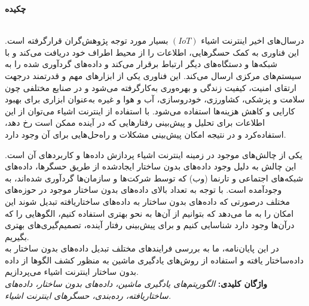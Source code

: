 %
%
%
%
\thispagestyle{empty}
\noindent
\centerline{\textbf{\large{چکیده}}} \\
درسال‌های اخیر اینترنت اشیاء $(IoT)$ بسیار مورد توجه پژوهش‌گران قرارگرفته‌ است. این فناوری به کمک حسگرهایی، ‌اطلاعات را از محیط اطراف خود دریافت می‌کند و با شبکه‌ها و دستگاه‌های دیگر ارتباط برقرار می‌کند و داده‌های گردآوری شده را به سیستم‌های مرکزی ارسال می‌کند. این فناوری یکی از ابزارهای مهم و قدرتمند درجهت ارتقای امنیت، کیفیت زندگی و بهره‌وری به‌کارگرفته می‌شود و در صنایع مختلفی چون سلامت و پزشکی، کشاورزی، خودروسازی، آب و هوا و غیره به‌عنوان ابزاری برای بهبود کارایی و کاهش هزینه‌ها استفاده می‌شود. با استفاده از اینترنت اشیاء می‌توان از این اطلاعات برای تحلیل و پیش‌بینی رفتارهایی که در آینده ممکن‌ است رخ‌ دهد، استفاده‌کرد و در نتیجه امکان پیش‌بینی مشکلات و راه‌حل‌هایی برای آن وجود ‌دارد.

یکی از چالش‌های موجود در زمینه اینترنت اشیاء پردازش داده‌ها و کاربرد‌های آن است. این چالش به دلیل وجود داده‌های بدون ساختار ایجاد‌شده از طریق حسگرها، داده‌های شبکه‌های اجتماعی و تارنما (وب) که توسط شرکت‌ها و سازمان‌ها گرد‌آوری شده‌اند، به وجود‌آمده است. با توجه به تعداد بالای داده‌های بدون ساختار موجود در حوزه‌های مختلف درصورتی که داده‌های بدون ساختار به داده‌های ساختاریافته تبدیل شوند این امکان را به ما می‌دهد که بتوانیم از آن‌ها به نحو بهتری استفاده کنیم، الگوهایی را که درآن‌ها وجود دارد شناسایی کنیم و برای پیش‌بینی رفتار آینده، تصمیم‌گیری‌های بهتری بگیریم.
\\
در این پایان‌نامه، ما به بررسی فرایندهای مختلف تبدیل داده‌های بدون ساختار به داده‌ساختار یافته و استفاده از روش‌های یادگیری ماشین به منظور کشف الگوها از داده‌ بدون ساختار اینترنت اشیاء می‌پردازیم.
\\

\noindent
\textbf{واژگان کلیدی:} 
\emph
{الگوریتم‌های یادگیری ماشین، داده‌های بدون ساختار، داده‌های ساختاریافته، رده‌بندی، حسگرهای‌ اینترنت اشیاء.}